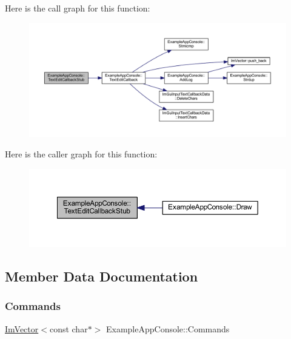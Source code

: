 Here is the call graph for this function\+:
\nopagebreak
\begin{figure}[H]
\begin{center}
\leavevmode
\includegraphics[width=350pt]{struct_example_app_console_a394debe3cbf3cfd93b9bfd2835a4fdec_cgraph}
\end{center}
\end{figure}
Here is the caller graph for this function\+:
\nopagebreak
\begin{figure}[H]
\begin{center}
\leavevmode
\includegraphics[width=350pt]{struct_example_app_console_a394debe3cbf3cfd93b9bfd2835a4fdec_icgraph}
\end{center}
\end{figure}


\subsection{Member Data Documentation}
\mbox{\label{struct_example_app_console_a1eebee69cceb0345cf9d9b6e6beb9d03}} 
\subsubsection{\texorpdfstring{Commands}{Commands}}
{\footnotesize\ttfamily \mbox{\hyperlink{class_im_vector}{Im\+Vector}}$<$const char$\ast$$>$ Example\+App\+Console\+::\+Commands}

